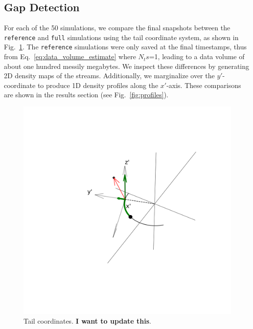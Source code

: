 \documentclass[draft]{aa}
\begin{document}
\begin{appendix}
  
  
  \section{Gap Detection} \label{sec:gap_detection}
    For each of the 50 simulations, we compare the final snapshots between the \texttt{reference} and \texttt{full} simulations using the tail coordinate system, as shown in Fig.~\ref{fig:TailCoordinates}. The \texttt{reference} simulations were only saved at the final timestamps, thus from Eq.~\ref{eq:data_volume_estimate} where $N_ts$=1, leading to a data volume of about one hundred messily megabytes. We inspect these differences by generating 2D density maps of the streams. Additionally, we marginalize over the $y'$-coordinate to produce 1D density profiles along the $x'$-axis. These comparisons are shown in the results section (see Fig.~\ref{fig:profiles}).
    \begin{figure}
      \centering
      \includegraphics[width=\linewidth]{along_orbit_coordinate_system-approved.png}
      \caption{Tail coordinates. \textbf{I want to update this}. }
      \label{fig:TailCoordinates}
    \end{figure}
  

\end{appendix}
\end{document}
